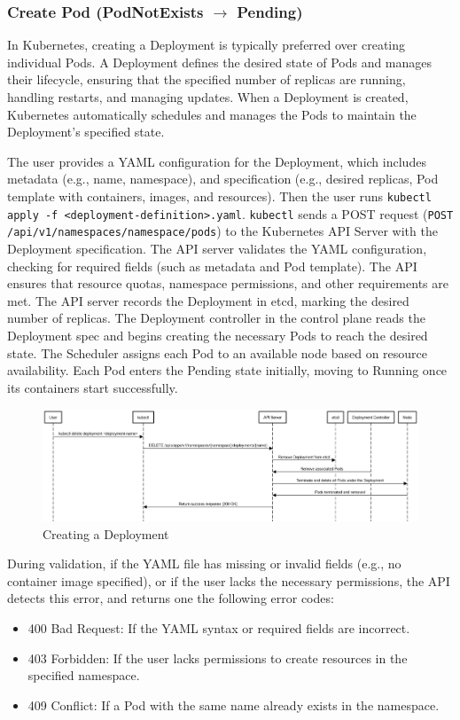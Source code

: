 \documentclass[main.tex]{subfiles}
\begin{document}
\subsubsection{Create Pod (PodNotExists $\rightarrow$ Pending)}
In Kubernetes, creating a Deployment is typically preferred over creating individual Pods. A Deployment defines the desired state of Pods and manages their lifecycle, ensuring that the specified number of replicas are running, handling restarts, and managing updates. When a Deployment is created, Kubernetes automatically schedules and manages the Pods to maintain the Deployment's specified state.

The user provides a YAML configuration for the Deployment, which includes metadata (e.g., name, namespace), and specification (e.g., desired replicas, Pod template with containers, images, and resources). Then the user runs \texttt{kubectl apply -f <deployment-definition>.yaml}.
\texttt{kubectl} sends a POST request (\texttt{POST /api/v1/namespaces/{namespace}/pods}) to the Kubernetes API Server with the Deployment specification. The API server validates the YAML configuration, checking for required fields (such as metadata and Pod template).
The API ensures that resource quotas, namespace permissions, and other requirements are met. The API server records the Deployment in etcd, marking the desired number of replicas.
The Deployment controller in the control plane reads the Deployment spec and begins creating the necessary Pods to reach the desired state. The Scheduler assigns each Pod to an available node based on resource availability.
Each Pod enters the Pending state initially, moving to Running once its containers start successfully.

\begin{figure}[H]
    \centering
    \includegraphics[width=\textwidth]{../uml_seq_diagrams/create_deployment.png}
    \caption{Creating a Deployment}
    \label{fig:create_deployment_diagram}
\end{figure}

During validation, if the YAML file has missing or invalid fields (e.g., no container image specified), or if the user lacks the necessary permissions, the API detects this error, and returns one the following error codes: 
\begin{itemize}
    \item 400 Bad Request: If the YAML syntax or required fields are incorrect.
    \item 403 Forbidden: If the user lacks permissions to create resources in the specified namespace.
    \item 409 Conflict: If a Pod with the same name already exists in the namespace.
\end{itemize}
\end{document}
